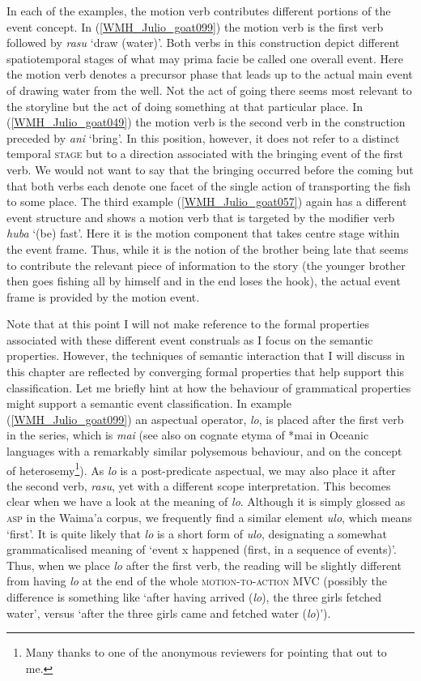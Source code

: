 In each of the examples, the motion verb contributes different portions of the event concept. In (\ref{WMH_Julio_goat099}) the motion verb is the first verb followed by \textit{rasu} `draw (water)'. Both verbs in this construction depict different spatiotemporal stages of what may prima facie be called one overall event. Here the motion verb denotes a precursor phase that leads up to the actual main event of drawing water from the well. Not the act of going there seems most relevant to the storyline but the act of doing something at that particular place. In (\ref{WMH_Julio_goat049}) the motion verb is the second verb in the construction preceded by \textit{ani} `bring'. In this position, however, it does not refer to a distinct temporal \textsc{stage} but to a direction associated with the bringing event of the first verb. We would not want to say that the bringing occurred before the coming but that both verbs each denote one facet of the single action of transporting the fish to some place. The third example (\ref{WMH_Julio_goat057}) again has a different event structure and shows a motion verb that is targeted by the modifier verb \textit{huba} `(be) fast'. Here it is the motion component that takes centre stage within the event frame. Thus, while it is the notion of the brother being late that seems to contribute the relevant piece of information to the story (the younger brother then goes fishing all by himself and in the end loses the hook), the actual event frame is provided by the motion event.

Note that at this point I will not make reference to the formal properties associated with these different event construals as I focus on the semantic properties. However, the techniques of semantic interaction that I will discuss in this chapter are reflected by converging formal properties that help support this classification. Let me briefly hint at how the behaviour of grammatical properties might support a semantic event classification. In example (\ref{WMH_Julio_goat099}) an aspectual operator, \textit{lo}, is placed after the first verb in the series, which is \textit{mai} (see also \citealt{lichtenberk1991semantic} on cognate etyma of *mai in Oceanic languages with a remarkably similar polysemous behaviour, and on the concept of heterosemy\footnote{Many thanks to one of the anonymous reviewers for pointing that out to me.}). As \textit{lo} is a post-predicate aspectual, we may also place it after the second verb, \textit{rasu}, yet with a different scope interpretation. This becomes clear when we have a look at the meaning of \textit{lo}. Although it is simply glossed as \textsc{asp} in the Waima'a corpus, we frequently find a similar element \textit{ulo}, which means `first'. It is quite likely that \textit{lo} is a short form of \textit{ulo}, designating a somewhat grammaticalised meaning of `event x happened (first, in a sequence of events)'. Thus, when we place \textit{lo} after the first verb, the reading will be slightly different from having \textit{lo} at the end of the whole \textsc{motion-to-action} MVC (possibly the difference is something like `after having arrived (\textit{lo}), the three girls fetched water', versus `after the three girls came and fetched water (\textit{lo})').

